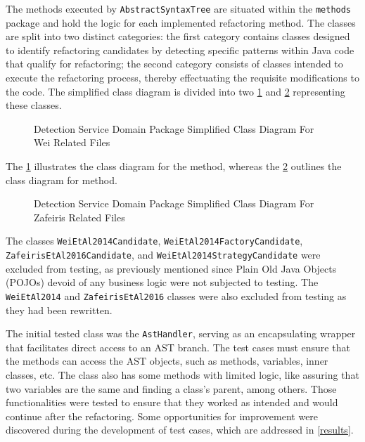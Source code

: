 The methods executed by \texttt{AbstractSyntaxTree} are situated within the \texttt{methods} package and hold the logic for each implemented refactoring method. The classes are split into two distinct categories: the first category contains classes designed to identify refactoring candidates by detecting specific patterns within Java code that qualify for refactoring; the second category consists of classes intended to execute the refactoring process, thereby effectuating the requisite modifications to the code. The simplified class diagram is divided into two \cref{fig-class-detection-domain-wei} and \cref{fig-class-detection-domain-zafeiris} representing these classes.

\begin{figure}[ht!]
\SetCaptionWidth{\textwidth}
\caption{Detection Service Domain Package Simplified Class Diagram For Wei Related Files}
\label{fig-class-detection-domain-wei}
\fontsize{4}{5}\selectfont

\end{figure}
\FloatBarrier

The \cref{fig-class-detection-domain-wei} illustrates the class diagram for the \cite{liu2014automated} method, whereas the \cref{fig-class-detection-domain-zafeiris} outlines the class diagram for \cite{zafeiris2017automated} method.

\begin{figure}[ht!]
\SetCaptionWidth{\textwidth}
\caption{Detection Service Domain Package Simplified Class Diagram For Zafeiris Related Files}
\label{fig-class-detection-domain-zafeiris}
\fontsize{5}{8}\selectfont

\end{figure}
\FloatBarrier

The classes \texttt{WeiEtAl2014Candidate}, \texttt{WeiEtAl2014FactoryCandidate}, \texttt{ZafeirisEtAl2016Candidate}, and \texttt{WeiEtAl2014StrategyCandidate} were excluded from testing, as previously mentioned since Plain Old Java Objects (POJOs) devoid of any business logic were not subjected to testing. The \texttt{WeiEtAl2014} and \texttt{ZafeirisEtAl2016} classes were also excluded from testing as they had been rewritten.

The initial tested class was the \texttt{AstHandler}, serving as an encapsulating wrapper that facilitates direct access to an AST branch. The test cases must ensure that the methods can access the AST objects, such as methods, variables, inner classes, etc. The class also has some methods with limited logic, like assuring that two variables are the same and finding a class's parent, among others. Those functionalities were tested to ensure that they worked as intended and would continue after the refactoring. Some opportunities for improvement were discovered during the development of test cases, which are addressed in \cref{results}. 

